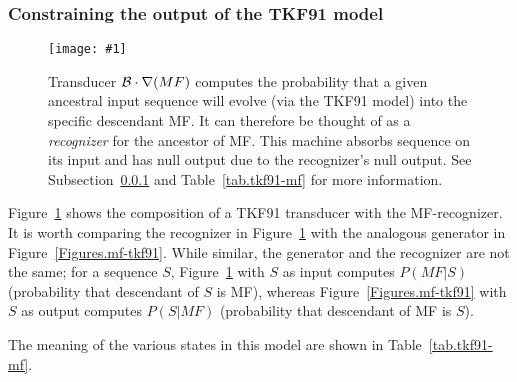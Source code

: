 \documentclass{article}
\newcommand{\secref}[1]{Subsection~\ref{sec.#1}}
\newcommand{\seclabel}[1]{\label{sec.#1}}
\newcommand{\tabnum}[1]{\ref{tab.#1}}
\newcommand{\tabref}[1]{Table~\tabnum{#1}}
\newcommand{\figref}[1]{Figure~\ref{Figures.#1}}
\newcommand{\figlabel}[1]{\label{Figures.#1}}
\newcommand{\easyfig}[4]{
\begin{figure}
\texttt{[image: \#1]}
\caption{ \figlabel{#3} #4}
\end{figure}}
\newcommand{\widepdffig}[2]{\easyfig{#1-fig.pdf}{width=\textwidth}{#1}{#2}}
\newcommand\tkf{{\cal B}}
\newcommand\recognize{\nabla}
\begin{document}

\subsubsection{Constraining the output of the TKF91 model}
\seclabel{tkf91-mf}

\widepdffig{tkf91-mf}{Transducer $\tkf \cdot \recognize(MF)$
computes the probability that a given ancestral input sequence will evolve (via the TKF91 model) into the specific descendant MF.  
It can therefore be thought of as a {\em recognizer} for the ancestor of MF.
This machine absorbs sequence on its input and has null output due to 
the recognizer's null output.
See \secref{tkf91-mf} and \tabref{tkf91-mf} for more information.
}

\figref{tkf91-mf} shows the composition of a TKF91 transducer with the MF-recognizer.  
It is worth comparing the recognizer in \figref{tkf91-mf}
with the analogous generator in \figref{mf-tkf91}. 
While similar, the generator and the recognizer are not the same;
for a sequence $S$,
\figref{tkf91-mf} with $S$ as input computes $P(MF|S)$
(probability that descendant of $S$ is MF), 
whereas \figref{mf-tkf91} with $S$ as output computes $P(S|MF)$
(probability that descendant of MF is $S$).

The meaning of the various states in this model are shown in \tabref{tkf91-mf}.
\end{document}
